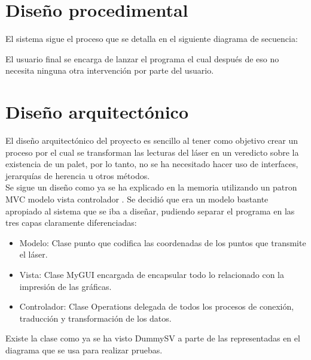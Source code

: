 \section{Diseño procedimental}

El sistema sigue el proceso que se detalla en el siguiente diagrama de secuencia:\\

El usuario final se encarga de lanzar el programa el cual después de eso no necesita ninguna otra intervención por parte del usuario.


\section{Diseño arquitectónico}


El diseño arquitectónico del proyecto es sencillo al tener como objetivo crear un proceso por el cual se transforman las lecturas del láser en un veredicto sobre la existencia de un palet, por lo tanto, no se ha necesitado hacer uso de interfaces, jerarquías de herencia u otros métodos.\\
Se sigue un diseño como ya se ha explicado en la memoria utilizando un patron MVC modelo vista controlador \cite{wiki:mvc}.
Se decidió que era un modelo bastante apropiado al sistema que se iba a diseñar, pudiendo separar el programa en las tres capas claramente diferenciadas:\\
\begin{itemize}
\item Modelo: Clase punto que codifica las coordenadas de los puntos que transmite el láser.
\item Vista: Clase MyGUI encargada de encapsular todo lo relacionado con la impresión de las gráficas.
\item Controlador: Clase Operations delegada de todos los procesos de conexión, traducción y transformación de los datos.
\end{itemize}


Existe la clase como ya se ha visto DummySV a parte de las representadas en el diagrama que se usa para realizar pruebas.